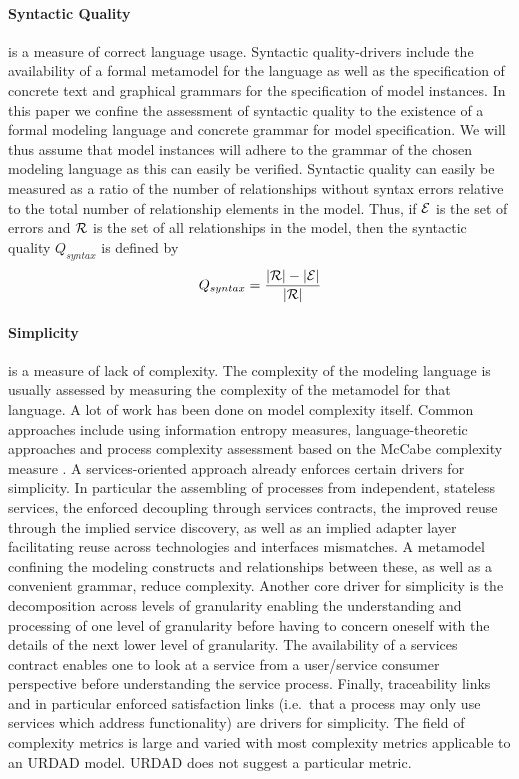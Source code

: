 \paragraph{Syntactic Quality} is a measure of correct language usage. Syntactic quality-drivers include the availability of a formal metamodel for the language as well as the specification of concrete text and graphical grammars for the specification of model instances. In this paper we confine the assessment of syntactic quality to the existence of a formal modeling language and concrete grammar for model specification. We will thus assume that model instances will adhere to the grammar of the chosen modeling language as this can easily be verified. Syntactic quality can easily be measured as a ratio of the number of relationships without syntax errors relative to the total number of relationship elements in the model. Thus, if $\cal{E}$ is the set of errors and $\cal{R}$ is the set of all relationships in the model, then the syntactic quality $Q_{syntax}$ is defined by
\begin{equation}
  Q_{syntax} = \frac{|\cal{R}| - |\cal{E}|}{|\cal{R}|}
\end{equation}

\paragraph{Simplicity} is a measure of lack of complexity. The complexity of the modeling language is usually assessed by measuring the complexity of the metamodel for that language\cite{mohagheghi_evaluating_2007}. A lot of work has been done on model complexity itself. Common approaches include using information entropy measures\cite{abrahamsson_extreme_2004}, language-theoretic approaches\cite{podgorelec_estimating_2007} and process complexity assessment based on the McCabe complexity measure \cite{mccabe_complexity_1976}. A services-oriented approach already enforces certain drivers for simplicity. In particular the assembling of processes from independent, stateless services, the enforced decoupling through services contracts, the improved reuse through the implied service discovery, as well as an implied adapter layer facilitating reuse across technologies and interfaces mismatches. A metamodel confining the modeling constructs and relationships between these, as well as a convenient grammar, reduce complexity. Another core driver for simplicity is the decomposition across levels of granularity enabling the understanding and processing of one level of granularity before having to concern oneself with the details of the next lower level of granularity. The availability of a services contract enables one to look at a service from a user/service consumer perspective before understanding the service process. Finally, traceability links and in particular enforced satisfaction links (i.e.\ that a process may only use services which address functionality) are drivers for simplicity. The field of complexity metrics is large and varied with most complexity metrics applicable to an URDAD model. URDAD does not suggest a particular metric.

